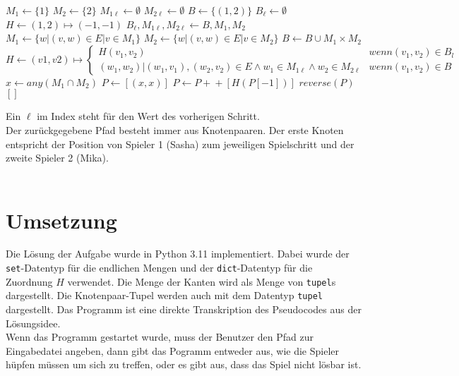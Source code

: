 \documentclass[a4paper,10pt,ngerman]{scrartcl}
\begin{document}
\begin{algorithmic}
  \State$M_1 \gets \{1\}$
  \State$M_2 \gets \{2\}$
  \State$M_{1\ell} \gets \emptyset$
  \State$M_{2\ell} \gets \emptyset$
  \State$B \gets \{(1, 2)\}$
  \State$B_{\ell} \gets \emptyset$
  \State$H \gets (1, 2) \mapsto (-1, -1)$
  \State$B_{\ell}, M_{1\ell}, M_{2\ell} \gets B, M_1, M_2$
  \State$M_1 \gets \{w | (v, w) \in E | v \in M_1\} $
  \State$M_2 \gets \{w | (v, w) \in E | v \in M_2\} $
  \State$B \gets B \cup M_1 \times M_2$
  \State$H \gets (v1, v2) \mapsto \begin{cases}
      H(v_1, v_2)                                                                 & wenn (v_1,v_2) \in B_l \\
      (w_1, w_2)|(w_1,v_1), (w_2,v_2) \in E \land w_1 \in M_{1\ell} \land w_2 \in M_{2\ell} & wenn (v_1,v_2) \in B
    \end{cases}$
  \EndWhile
  \State$x \gets any(M_1 \cap M_2)$
  \State$P \gets [(x,x)]$
  \State$P \gets P +\!\!\!+ [H(P[-1])]$
  \EndWhile
  \State \Return $reverse(P)$
  \Else
  \State \Return $[]$
  \EndIf
  \EndProcedure
\end{algorithmic}
Ein $\ell$ im Index steht für den Wert des vorherigen Schritt.\\
Der zurückgegebene Pfad besteht immer aus Knotenpaaren. Der erste Knoten entspricht der Position von Spieler 1 (Sasha) zum jeweiligen Spielschritt und der zweite Spieler 2 (Mika).\\\\
\section{Umsetzung}
Die Lösung der Aufgabe wurde in Python 3.11 implementiert. Dabei wurde der
\lstinline|set|-Datentyp für die endlichen Mengen und der
\lstinline|dict|-Datentyp für die Zuordnung $H$ verwendet. Die Menge der Kanten
wird als Menge von \lstinline|tupel|s dargestellt. Die Knotenpaar-Tupel werden
auch mit dem Datentyp \lstinline|tupel| dargestellt. Das Programm ist eine
direkte Transkription des Pseudocodes aus der Lösungsidee.\\
Wenn das Programm gestartet wurde, muss der Benutzer den Pfad zur Eingabedatei angeben, dann gibt das Pogramm entweder aus, wie die Spieler hüpfen müssen um sich zu treffen, oder es gibt aus, dass das Spiel nicht lösbar ist.\\
\end{document}
